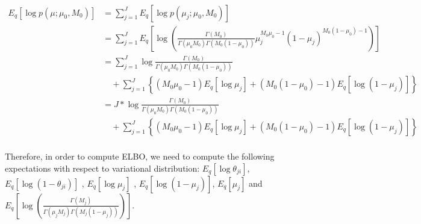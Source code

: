 \documentclass[11pt,reqno]{amsart}
\begin{document}
\begin{equation}
\begin{split}
%
\end{split}
\end{equation}

\begin{equation}
\begin{split}
\label{mu}
E_q \left[ \log p\left(\mu ; \mu_0, M_0 \right)\right] &= \sum_{j=1}^{J} E_q  \left[ \log p\left( \mu_j; \mu_0, M_0 \right) \right] \\
&= \sum_{j=1}^{J} E_q  \left[ \log \left( \frac{ \Gamma(M_0) } { \Gamma(\mu_0 M_0) \Gamma(M_0 (1-\mu_0)) } \mu_j^{M_0\mu_0 -1} (1 - \mu_j)^{M_0 ( 1 - \mu_0) - 1} \right) \right] \\
&= \sum_{j=1}^{J} \log \frac{ \Gamma(M_0) } { \Gamma(\mu_0 M_0) \Gamma(M_0 (1-\mu_0))} \\
&\quad + \sum_{j=1}^{J} \left\lbrace (M_0\mu_0 -1)E_q  \left[ \log \mu_j \right] + (M_0 ( 1 - \mu_0) - 1) E_q  \left[ \log (1 - \mu_j)\right]\right\rbrace  \\
&= J* \log \frac{ \Gamma(M_0) } { \Gamma(\mu_0 M_0) \Gamma(M_0 (1-\mu_0))} \\
&\quad + \sum_{j=1}^{J} \left\lbrace (M_0\mu_0 -1)E_q  \left[ \log \mu_j \right] + (M_0 ( 1 - \mu_0) - 1) E_q  \left[ \log (1 - \mu_j)\right]\right\rbrace  \\
%
%
\end{split}
\end{equation}

Therefore, in order to compute ELBO, we need to compute the following expectations with respect to variational distribution: $ E_q \left[ \log \theta_{ji} \right] $, $ E_q\left[ \log \left( 1 - \theta_{ji}\right) \right] $ , $ E_q  \left[ \log \mu_j \right] $ , $ E_q  \left[ \log (1 - \mu_j)\right] $, $ E_q \left[ \mu_j \right] $ and $ E_q\left[ \log \left( \frac{ \Gamma(M_j) } { \Gamma(\mu_j M_j) \Gamma(M_j (1-\mu_j)) }\right)\right]  $. %
\end{document}
